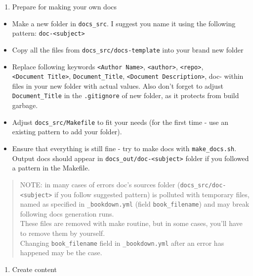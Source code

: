 \documentclass[
  12pt,
  a4paper,
  12pt,
  oneside,
  openany]{book}
\providecommand{\tightlist}{%
  \setlength{\itemsep}{0pt}\setlength{\parskip}{0pt}}
\begin{document}
\begin{enumerate}
\def\labelenumi{\arabic{enumi}.}
\setcounter{enumi}{1}
\tightlist
\item
  Prepare for making your own docs
\end{enumerate}

\begin{itemize}
\item
  Make a new folder in \texttt{docs\_src}. I suggest you name it using the following pattern: \texttt{doc-\textless{}subject\textgreater{}}
\item
  Copy all the files from \texttt{docs\_src/docs-template} into your brand new folder
\item
  Replace following keywords \texttt{\textless{}Author\ Name\textgreater{}}, \texttt{\textless{}author\textgreater{}}, \texttt{\textless{}repo\textgreater{}}, \texttt{\textless{}Document\ Title\textgreater{}}, \texttt{Document\_Title}, \texttt{\textless{}Document\ Description\textgreater{}}, doc- within files in your new folder with actual values. Also don't forget to adjust \texttt{Document\_Title} in the \texttt{.gitignore} of new folder, as it protects from build garbage.
\item
  Adjust \texttt{docs\_src/Makefile} to fit your needs (for the first time - use an existing pattern to add your folder).
\item
  Ensure that everything is still fine - try to make docs with \texttt{make\_docs.sh}.\\
  Output docs should appear in \texttt{docs\_out/doc-\textless{}subject\textgreater{}} folder if you followed a pattern in the Makefile.
\end{itemize}

\begin{quote}
NOTE: in many cases of errors doc's sources folder (\texttt{docs\_src/doc-\textless{}subject\textgreater{}} if you follow suggested pattern) is polluted with temporary files, named as specified in \texttt{\_bookdown.yml} (field \texttt{book\_filename}) and may break following docs generation runs.\\
These files are removed with make routine, but in some cases, you'll have to remove them by yourself.\\
Changing \texttt{book\_filename} field in \texttt{\_bookdown.yml} after an error has happened may be the case.
\end{quote}

\begin{enumerate}
\def\labelenumi{\arabic{enumi}.}
\setcounter{enumi}{2}
\tightlist
\item
  Create content
\end{enumerate}
\end{document}
